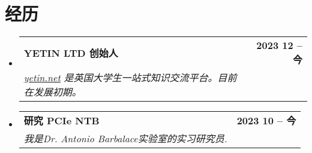 \documentclass[letterpaper,11pt]{ctexart}
\makeatletter
\newcommand{\resumeItem}[1]{
  \item\small{
    {#1 \vspace{-2pt}}
  }
}
\newcommand{\resumeSubheading}[4]{
  \vspace{-2pt}\item
    \begin{tabular*}{1.0\textwidth}[t]{l@{\extracolsep{\fill}}r}
      \textbf{#1} & \textbf{\small #2} \\
      \textit{\small#3} & \textit{\small #4} \\
    \end{tabular*}\vspace{-7pt}
}
\newcommand{\resumeSubHeadingListStart}{\begin{itemize}[leftmargin=0.0in, label={}]}
\newcommand{\resumeSubHeadingListEnd}{\end{itemize}}
\newcommand{\resumeItemListStart}{\begin{itemize}}
\newcommand{\resumeItemListEnd}{\end{itemize}\vspace{-5pt}}
\makeatother
\begin{document}


\section{经历}
  \resumeSubHeadingListStart
    \resumeSubheading
	{YETIN LTD 创始人}{2023 12 -- 今}
	{\href{https://yetin.net}{\underline{yetin.net}} 是英国大学生一站式知识交流平台。目前在发展初期。}{}
    \resumeSubheading
	{研究 PCIe NTB}{2023 10 -- 今}
	{我是Dr. Antonio Barbalace实验室的实习研究员.}{}
  \resumeSubHeadingListEnd

%
%     
\end{document}
